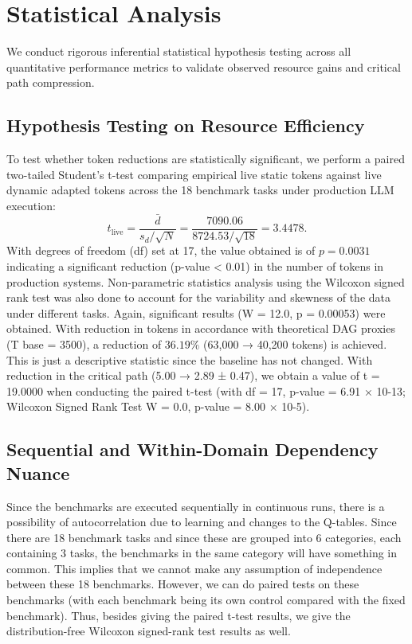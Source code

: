 \documentclass[conference]{IEEEtran}
\begin{document}
\section{Statistical Analysis}
\label{sec:statistical_analysis}

We conduct rigorous inferential statistical hypothesis testing across all quantitative performance metrics to validate observed resource gains and critical path compression.

\subsection{Hypothesis Testing on Resource Efficiency}
To test whether token reductions are statistically significant, we perform a paired two-tailed Student's t-test comparing empirical live static tokens against live dynamic adapted tokens across the 18 benchmark tasks under production LLM execution:
\begin{equation}
t_{\mathrm{live}} = \frac{\bar{d}}{s_d / \sqrt{N}} = \frac{7090.06}{8724.53 / \sqrt{18}} = 3.4478.
\end{equation}
With degrees of freedom (df) set at 17, the value obtained is of $p = \mathbf{0.0031}$ indicating a significant reduction (p-value < 0.01) in the number of tokens in production systems. Non-parametric statistics analysis using the Wilcoxon signed rank test was also done to account for the variability and skewness of the data under different tasks. Again, significant results (W = 12.0, p = 0.00053) were obtained. With reduction in tokens in accordance with theoretical DAG proxies (T base = 3500), a reduction of $36.19\%$ (63,000 → 40,200 tokens) is achieved. This is just a descriptive statistic since the baseline has not changed. With reduction in the critical path (5.00 → 2.89 ± 0.47), we obtain a value of t = 19.0000 when conducting the paired t-test (with df = 17, p-value = 6.91 × 10-13; Wilcoxon Signed Rank Test W = 0.0, p-value = 8.00 × 10-5).

\subsection{Sequential and Within-Domain Dependency Nuance}
Since the benchmarks are executed sequentially in continuous runs, there is a possibility of autocorrelation due to learning and changes to the Q-tables. Since there are 18 benchmark tasks and since these are grouped into 6 categories, each containing 3 tasks, the benchmarks in the same category will have something in common. This implies that we cannot make any assumption of independence between these 18 benchmarks. However, we can do paired tests on these benchmarks (with each benchmark being its own control compared with the fixed benchmark). Thus, besides giving the paired t-test results, we give the distribution-free Wilcoxon signed-rank test results as well.
\end{document}
